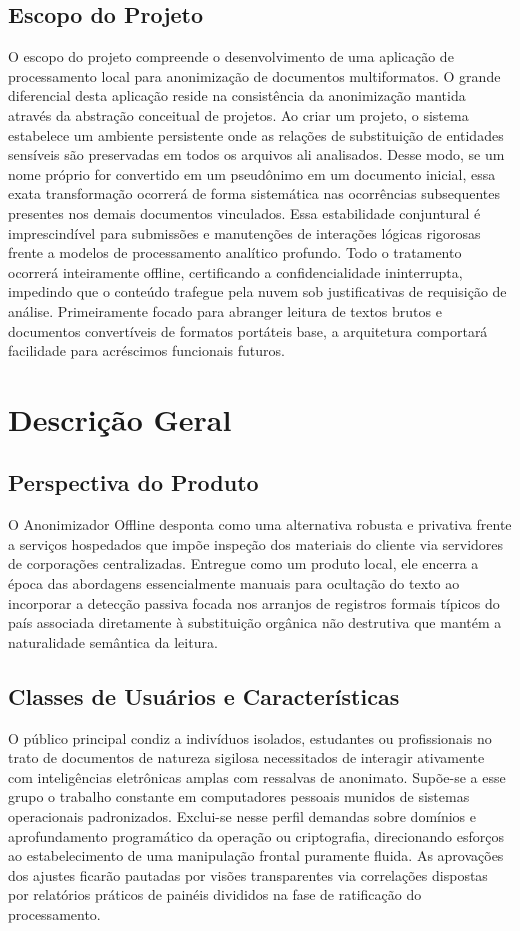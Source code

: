 \documentclass{scrreprt}
\begin{document}
\section{Escopo do Projeto}
O escopo do projeto compreende o desenvolvimento de uma aplicação de processamento local para anonimização de documentos multiformatos. O grande diferencial desta aplicação reside na consistência da anonimização mantida através da abstração conceitual de projetos. Ao criar um projeto, o sistema estabelece um ambiente persistente onde as relações de substituição de entidades sensíveis são preservadas em todos os arquivos ali analisados. Desse modo, se um nome próprio for convertido em um pseudônimo em um documento inicial, essa exata transformação ocorrerá de forma sistemática nas ocorrências subsequentes presentes nos demais documentos vinculados. Essa estabilidade conjuntural é imprescindível para submissões e manutenções de interações lógicas rigorosas frente a modelos de processamento analítico profundo. Todo o tratamento ocorrerá inteiramente offline, certificando a confidencialidade ininterrupta, impedindo que o conteúdo trafegue pela nuvem sob justificativas de requisição de análise. Primeiramente focado para abranger leitura de textos brutos e documentos convertíveis de formatos portáteis base, a arquitetura comportará facilidade para acréscimos funcionais futuros.

\chapter{Descrição Geral}

\section{Perspectiva do Produto}
O Anonimizador Offline desponta como uma alternativa robusta e privativa frente a serviços hospedados que impõe inspeção dos materiais do cliente via servidores de corporações centralizadas. Entregue como um produto local, ele encerra a época das abordagens essencialmente manuais para ocultação do texto ao incorporar a detecção passiva focada nos arranjos de registros formais típicos do país associada diretamente à substituição orgânica não destrutiva que mantém a naturalidade semântica da leitura.

\section{Classes de Usuários e Características}
O público principal condiz a indivíduos isolados, estudantes ou profissionais no trato de documentos de natureza sigilosa necessitados de interagir ativamente com inteligências eletrônicas amplas com ressalvas de anonimato. Supõe-se a esse grupo o trabalho constante em computadores pessoais munidos de sistemas operacionais padronizados. Exclui-se nesse perfil demandas sobre domínios e aprofundamento programático da operação ou criptografia, direcionando esforços ao estabelecimento de uma manipulação frontal puramente fluida. As aprovações dos ajustes ficarão pautadas por visões transparentes via correlações dispostas por relatórios práticos de painéis divididos na fase de ratificação do processamento.
\end{document}
